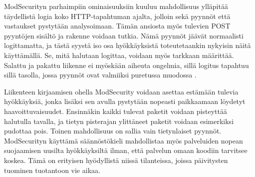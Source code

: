 ModSecurityn parhaimpiin ominaisuuksiin kuuluu mahdollisuus ylläpitää täydellistä logia koko HTTP-tapahtuman ajalta, jolloin sekä pyynnöt että vastaukset pystytään analysoimaan.
Tämän ansiosta myös tulevien POST pyyntöjen sisältö ja rakenne voidaan tutkia. Nämä pyynnöt jäävät normaalisti logittamatta, ja tästä syystä iso osa hyökkäyksistä toteutetaankin 
nykyisin näitä käyttämällä. Se, mitä halutaan logittaa, voidaan myös tarkkaan määrittää. Salattu ja pakattu liikenne ei myöskään aiheuta ongelmia, sillä logitus tapahtuu sillä tasolla,
jossa pyynnöt ovat valmiiksi puretussa muodossa \cite{Mod}.

Liikenteen kirjaamisen ohella ModSecurity voidaan asettaa estämään tulevia hyökkäyksiä, jonka lisäksi sen avulla pystytään nopeasti paikkaamaan löydetyt haavoittuvaisuudet. 
Ensinnäkin kaikki tulevat paketit voidaan pisteyttää halutulla tavalla, ja tietyn pisterajan ylittäneet paketit voidaan esimerkiksi pudottaa pois. Toinen mahdollisuus on sallia vain 
tietynlaiset pyynnöt. ModSecurityn käyttämä säännöstökieli mahdollistaa myös palveluiden nopean suojaamisen uusilta hyökkäyksiltä ilman, että palvelun omaan koodiin tarvitsee koskea.
Tämä on erityisen hyödyllistä niissä tilanteissa, joissa päivitysten tuominen tuotantoon vie aikaa. 


